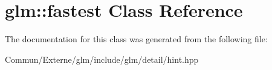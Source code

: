 \hypertarget{classglm_1_1fastest}{}\section{glm\+:\+:fastest Class Reference}
\label{classglm_1_1fastest}


The documentation for this class was generated from the following file\+:\begin{DoxyCompactItemize}
\item 
Commun/\+Externe/glm/include/glm/detail/hint.\+hpp\end{DoxyCompactItemize}
